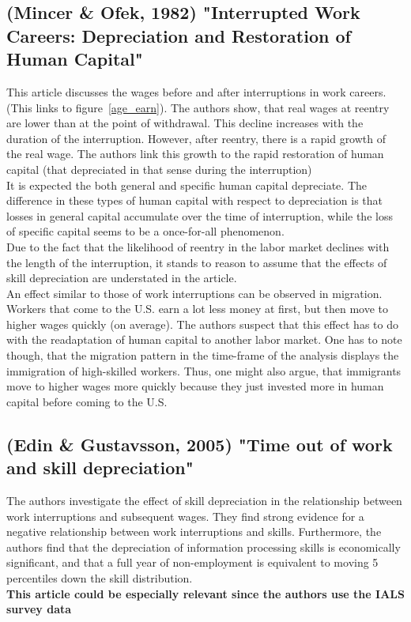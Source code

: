 \documentclass[12pt,a4paper]{article}
\begin{document}
  \subsection{(Mincer \& Ofek, 1982) "Interrupted Work Careers: Depreciation and Restoration of Human Capital"} %
  \label{sub:mincer}
  This article discusses the wages before and after interruptions in work careers. (This links to figure~\ref{age_earn}).
  The authors show, that real wages at reentry are lower than at the point of withdrawal. This decline increases with the
  duration of the interruption. However, after reentry, there is a rapid growth of the real wage. The authors link this 
  growth to the rapid restoration of human capital (that depreciated in that sense during the interruption)\\
  It is expected the both general and specific human capital depreciate. The difference in these types of human capital
  with respect to depreciation is that losses in general capital accumulate over the time of interruption, while
  the loss of specific capital seems to be a once-for-all phenomenon.\\
  Due to the fact that the likelihood of reentry in the labor market declines with the length of the interruption, 
  it stands to reason to assume that the effects of skill depreciation are understated in the article.\\
  An effect similar to those of work interruptions can be observed in migration. Workers that come to the U.S. earn a
  lot less money at first, but then move to higher wages quickly (on average). The authors suspect that this effect
  has to do with the readaptation of human capital to another labor market. One has to note though, that the migration
  pattern in the time-frame of the analysis displays the immigration of high-skilled workers. Thus, one might also
  argue, that immigrants move to higher wages more quickly because they just invested more in human capital before
  coming to the U.S.


  \subsection{(Edin \& Gustavsson, 2005) "Time out of work and skill depreciation"} %
  \label{sub:edin}
  The authors investigate the effect of skill depreciation in the relationship between work interruptions and 
  subsequent wages. They find strong evidence for a negative relationship between work interruptions and skills.
  Furthermore, the authors find that the depreciation of information processing skills is economically significant,
  and that a full year of non-employment is equivalent to moving 5 percentiles down the skill distribution.\\
  \textbf{This article could be especially relevant since the authors use the IALS survey data}\\
\end{document}
